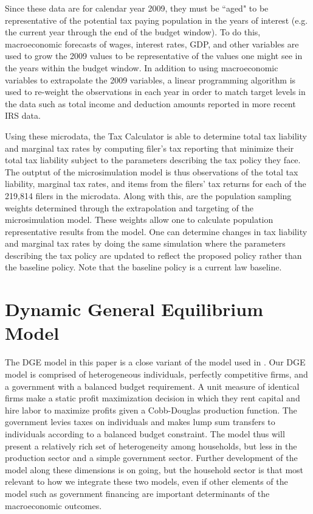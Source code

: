 \documentclass[letterpaper,12pt]{article}
\theoremstyle{definition}
\begin{document}
\begin{spacing}{1.5}
  Since these data are for calendar year 2009, they must be ``aged" to be representative of the potential tax paying population in the years of interest (e.g. the current year through the end of the budget window).  To do this, macroeconomic forecasts of wages, interest rates, GDP, and other variables are used to grow the 2009 values to be representative of the values one might see in the years within the budget window.  In addition to using macroeconomic variables to extrapolate the 2009 variables, a linear programming algorithm is used to re-weight the observations in each year in order to match target levels in the data such as total income and deduction amounts reported in more recent IRS data.

  Using these microdata, the Tax Calculator is able to determine total tax liability and marginal tax rates by computing filer's tax reporting that minimize their total tax liability subject to the parameters describing the tax policy they face. The outptut of the microsimulation model is thus observations of the total tax liability, marginal tax rates, and items from the filers' tax returns for each of the 219,814 filers in the microdata. Along with this, are the population sampling weights determined through the extrapolation and targeting of the microsimulation model. These weights allow one to calculate population representative results from the model. One can determine changes in tax liability and marginal tax rates by doing the same simulation where the parameters describing the tax policy are updated to reflect the proposed policy rather than the baseline policy. Note that the baseline policy is a current law baseline.


\section{Dynamic General Equilibrium Model}\label{SecDGE}

  The DGE model in this paper is a close variant of the model used in \citet{DEMPRW2015}. Our DGE model is comprised of heterogeneous individuals, perfectly competitive firms, and a government with a balanced budget requirement. A unit measure of identical firms make a static profit maximization decision in which they rent capital and hire labor to maximize profits given a Cobb-Douglas production function. The government levies taxes on individuals and makes lump sum transfers to individuals according to a balanced budget constraint.  The model thus will present a relatively rich set of heterogeneity among households, but less in the production sector and a simple government sector.  Further development of the model along these dimensions is on going, but the household sector is that most relevant to how we integrate these two models, even if other elements of the model such as government financing are important determinants of the macroeconomic outcomes.


\end{spacing}
\end{document}
